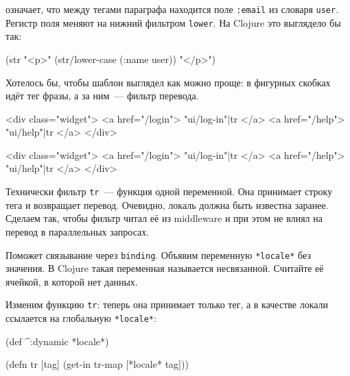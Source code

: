 \noindent
означает, что между тегами параграфа находится поле \verb|:email| из словаря
\verb|user|. Регистр поля меняют на нижний фильтром \verb|lower|. На Clojure
это выглядело бы так:


\begin{english}
  \begin{clojure}
(str "<p>" (str/lower-case (:name user)) "</p>")
  \end{clojure}
\end{english}

Хотелось бы, чтобы шаблон выглядел как можно проще: в фигурных скобках идёт тег
фразы, а за ним~--- фильтр перевода.

\ifnarrow

\begin{english}
  \begin{htmldjango}
<div class="widget">
  <a href="/login">
    {{ "ui/log-in"|tr }}
  </a>
  <a href="/help">
    {{ "ui/help"|tr }}
  </a>
</div>
  \end{htmldjango}
\end{english}

\else

\begin{english}
  \begin{htmldjango}
<div class="widget">
  <a href="/login">{{ "ui/log-in"|tr }}</a>
  <a href="/help">{{ "ui/help"|tr }}</a>
</div>
  \end{htmldjango}
\end{english}

\fi

Технически фильтр \verb|tr|~--- функция одной переменной. Она принимает строку
тега и возвращает перевод. Очевидно, локаль должна быть известна
заранее. Сделаем так, чтобы фильтр читал её из middleware и при этом не влиял на
перевод в параллельных запросах.

Поможет связывание через \verb|binding|. Объявим переменную \verb|*locale*| без
значения. В Clojure такая переменная называется несвязанной. Считайте её
ячейкой, в которой нет данных.

Изменим функцию \verb|tr|: теперь она принимает только тег, а в качестве
локали ссылается на глобальную \verb|*locale*|:

\begin{english}
  \begin{clojure}
(def ^:dynamic *locale*)

(defn tr [tag]
  (get-in tr-map [*locale* tag]))
  \end{clojure}
\end{english}

